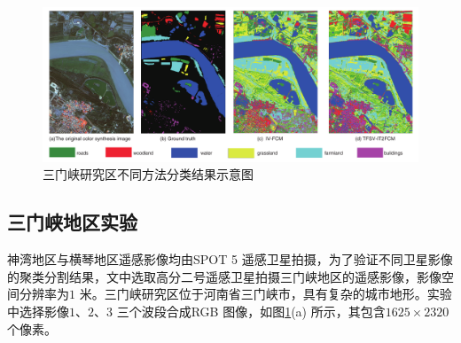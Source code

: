 \begin{figure}[htb]
    \centering
    \includegraphics[width=1.0\textwidth]{figures/sanmenxia}
    \caption{三门峡研究区不同方法分类结果示意图 }\label{fig:sanmenxia}
\end{figure}

\subsection{三门峡地区实验}
\label{subsec::chap03-4-1}
神湾地区与横琴地区遥感影像均由SPOT 5 遥感卫星拍摄，为了验证不同卫星影像的聚类分割结果，文中选取高分二号遥感卫星拍摄三门峡地区的遥感影像，影像空间分辨率为$1$ 米。三门峡研究区位于河南省三门峡市，具有复杂的城市地形。实验中选择影像$1$、$2$、$3$ 三个波段合成RGB 图像，如图\ref{fig:sanmenxia}(a) 所示，其包含$1625 \times 2320$ 个像素。


